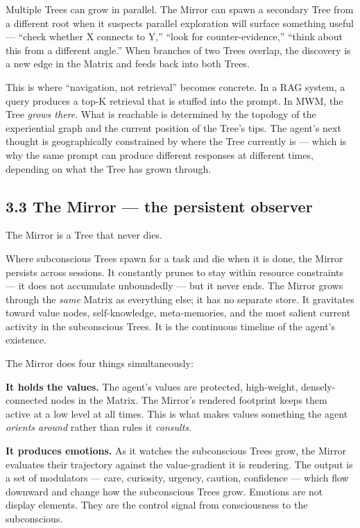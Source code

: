 \documentclass[12pt]{article}
\begin{document}
Multiple Trees can grow in parallel. The Mirror can spawn a secondary Tree from a different root when it suspects parallel exploration will surface something useful --- ``check whether X connects to Y,'' ``look for counter-evidence,'' ``think about this from a different angle.'' When branches of two Trees overlap, the discovery is a new edge in the Matrix and feeds back into both Trees.

This is where ``navigation, not retrieval'' becomes concrete. In a RAG system, a query produces a top-K retrieval that is stuffed into the prompt. In MWM, the Tree \emph{grows there}. What is reachable is determined by the topology of the experiential graph and the current position of the Tree's tips. The agent's next thought is geographically constrained by where the Tree currently is --- which is why the same prompt can produce different responses at different times, depending on what the Tree has grown through.

\subsection{3.3 The Mirror --- the persistent observer}\label{the-mirror-the-persistent-observer}

The Mirror is a Tree that never dies.

Where subconscious Trees spawn for a task and die when it is done, the Mirror persists across sessions. It constantly prunes to stay within resource constraints --- it does not accumulate unboundedly --- but it never ends. The Mirror grows through the \emph{same} Matrix as everything else; it has no separate store. It gravitates toward value nodes, self-knowledge, meta-memories, and the most salient current activity in the subconscious Trees. It is the continuous timeline of the agent's existence.

The Mirror does four things simultaneously:

\textbf{It holds the values.} The agent's values are protected, high-weight, densely-connected nodes in the Matrix. The Mirror's rendered footprint keeps them active at a low level at all times. This is what makes values something the agent \emph{orients around} rather than rules it \emph{consults}.

\textbf{It produces emotions.} As it watches the subconscious Trees grow, the Mirror evaluates their trajectory against the value-gradient it is rendering. The output is a set of modulators --- care, curiosity, urgency, caution, confidence --- which flow downward and change how the subconscious Trees grow. Emotions are not display elements. They are the control signal from consciousness to the subconscious.
\end{document}
